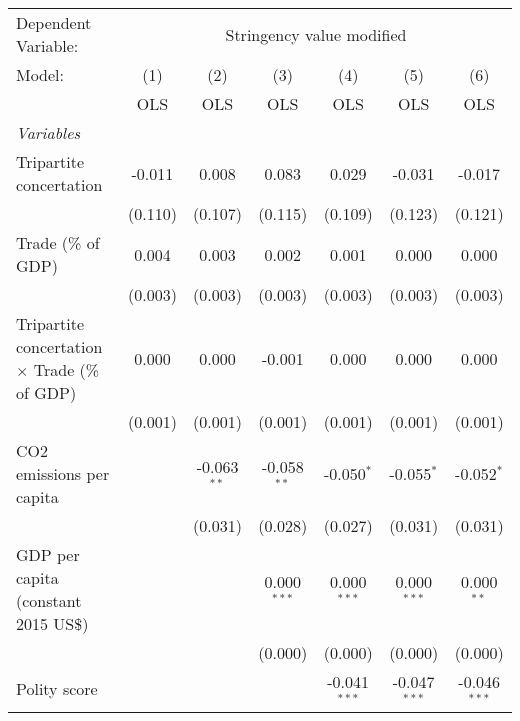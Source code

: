 
\begingroup
\centering
\begin{tabular}{lcccccc}
   \toprule
   Dependent Variable: & \multicolumn{6}{c}{Stringency value modified}\\
   Model:                                               & (1)     & (2)           & (3)           & (4)            & (5)            & (6)\\  
                                                        &  OLS    & OLS           & OLS           & OLS            & OLS            & OLS\\  
   \midrule
   \emph{Variables}\\
   Tripartite concertation                              & -0.011  & 0.008         & 0.083         & 0.029          & -0.031         & -0.017\\   
                                                        & (0.110) & (0.107)       & (0.115)       & (0.109)        & (0.123)        & (0.121)\\   
   Trade (\% of GDP)                                    & 0.004   & 0.003         & 0.002         & 0.001          & 0.000          & 0.000\\   
                                                        & (0.003) & (0.003)       & (0.003)       & (0.003)        & (0.003)        & (0.003)\\   
   Tripartite concertation $\times$ Trade (\% of GDP)   & 0.000   & 0.000         & -0.001        & 0.000          & 0.000          & 0.000\\   
                                                        & (0.001) & (0.001)       & (0.001)       & (0.001)        & (0.001)        & (0.001)\\   
   CO2 emissions per capita                             &         & -0.063$^{**}$ & -0.058$^{**}$ & -0.050$^{*}$   & -0.055$^{*}$   & -0.052$^{*}$\\   
                                                        &         & (0.031)       & (0.028)       & (0.027)        & (0.031)        & (0.031)\\   
   GDP per capita (constant 2015 US\$)                  &         &               & 0.000$^{***}$ & 0.000$^{***}$  & 0.000$^{***}$  & 0.000$^{**}$\\   
                                                        &         &               & (0.000)       & (0.000)        & (0.000)        & (0.000)\\   
   Polity score                                         &         &               &               & -0.041$^{***}$ & -0.047$^{***}$ & -0.046$^{***}$\\   

\end{tabular}

